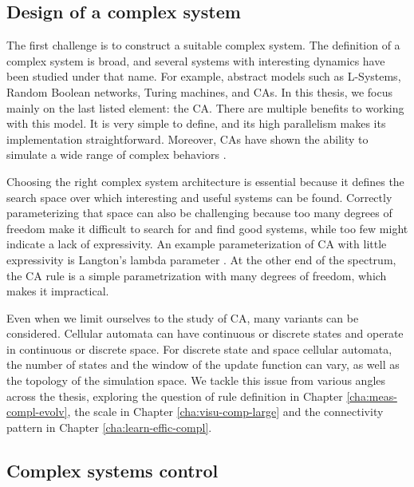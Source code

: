 \subsection{Design of a complex system\label{sec:design-compl-syst}}

The first challenge is to construct a suitable complex system. The definition of a 
complex system is broad, and several systems with
interesting dynamics have been studied under that name. For example, abstract models such as L-Systems,
Random Boolean networks, Turing machines, and \Acfp{CA}. In this thesis, we
focus mainly on the last listed element: the \acl{CA}. There are multiple
benefits to working with this model. It is very simple to define, and its high
parallelism makes its implementation straightforward. Moreover, \acp{CA} have
shown the ability to simulate a wide range of complex behaviors
\parencite{wolframNewKindScience2002}.

Choosing the right complex system architecture is essential because it defines
the search space over which interesting and useful systems can be found.
Correctly parameterizing that space can also be challenging because too many
degrees of freedom make it difficult to search for and find good systems, while
too few might indicate a lack of expressivity. An example parameterization of
\ac{CA} with little expressivity is Langton's lambda parameter
\parencite{langtonComputationEdgeChaos1990}. At the other end of the spectrum, the
\ac{CA} rule is a simple parametrization with many degrees of freedom, which
makes it impractical.

Even when we limit ourselves to the study of \ac{CA}, many variants can be
considered. Cellular automata can have continuous or discrete states and operate
in continuous or discrete space. For discrete state and space cellular automata,
the number of states and the window of the update function can vary, as well as the
topology of the simulation space. We tackle this issue from various angles
across the thesis, exploring the question of rule definition in Chapter
\ref{cha:meas-compl-evolv}, the scale in Chapter \ref{cha:visu-comp-large} and
the connectivity pattern in Chapter \ref{cha:learn-effic-compl}.

\subsection{Complex systems control}\label{sec:compl-syst-contr}

